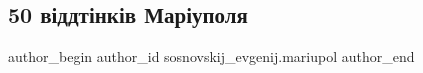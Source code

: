  
 
 
 
 

\subsection{50 віддтінків Маріуполя}
\label{sec:19_02_2023.fb.sosnovskij_evgenij.mariupol.1.50_v_ddt_nk_v_mar_up}

\ifcmt
 author_begin
   author_id sosnovskij_evgenij.mariupol
 author_end
\fi
